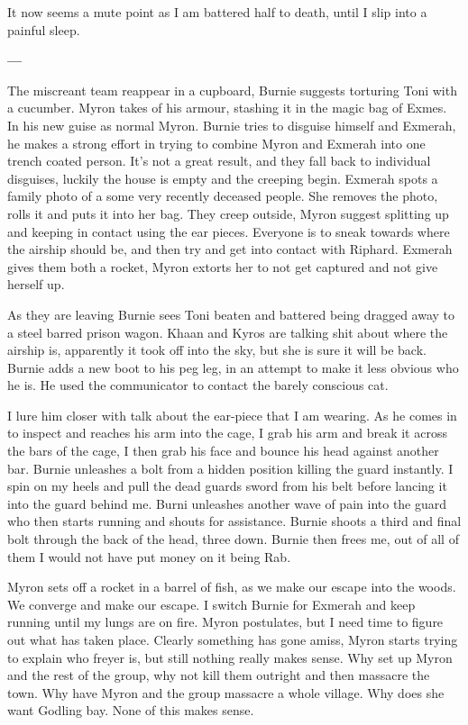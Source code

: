 It now seems a mute point as I am battered half to death, until I slip into a painful sleep.\medskip

\textbf{---}\medskip

The miscreant team reappear in a cupboard, Burnie suggests torturing Toni with a cucumber. Myron takes of his armour, stashing it in the magic bag of Exmes. In his new guise as normal Myron. Burnie tries to disguise himself and Exmerah, he makes a strong effort in trying to combine Myron and Exmerah into one trench coated person. It’s not a great result, and they fall back to individual disguises, luckily the house is empty and the creeping begin. Exmerah spots a family photo of a some very recently deceased people. She removes the photo, rolls it and puts it into her bag. They creep outside, Myron suggest splitting up and keeping in contact using the ear pieces. Everyone is to sneak towards where the airship should be, and then try and get into contact with Riphard. Exmerah gives them both a rocket, Myron extorts her to not get captured and not give herself up.\medskip

As they are leaving Burnie sees Toni beaten and battered being dragged away to a steel barred prison wagon. Khaan and Kyros are talking shit about where the airship is, apparently it took off into the sky, but she is sure it will be back. Burnie adds a new boot to his peg leg, in an attempt to make it less obvious who he is. He used the communicator to contact the barely conscious cat.\medskip

I lure him closer with talk about the ear-piece that I am wearing. As he comes in to inspect and reaches his arm into the cage, I grab his arm and break it across the bars of the cage, I then grab his face and bounce his head against another bar. Burnie unleashes a bolt from a hidden position killing the guard instantly. I spin on my heels and pull the dead guards sword from his belt before lancing it into the guard behind me. Burni unleashes another wave of pain into the guard who then starts running and shouts for assistance. Burnie shoots a third and final bolt through the back of the head, three down. Burnie then frees me, out of all of them I would not have put money on it being Rab.\medskip

Myron sets off a rocket in a barrel of fish, as we make our escape into the woods. We converge and make our escape. I switch Burnie for Exmerah and keep running until my lungs are on fire. Myron postulates, but I need time to figure out what has taken place. Clearly something has gone amiss, Myron starts trying to explain who freyer is, but still nothing really makes sense. Why set up Myron and the rest of the group, why not kill them outright and then massacre the town. Why have Myron and the group massacre a whole village. Why does she want Godling bay. None of this makes sense.\medskip

